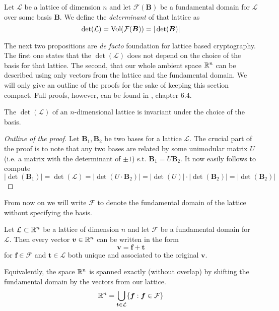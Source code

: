 \begin{definition}
    Let $\mathcal{L}$ be a lattice of dimension $n$ and let $\mathcal{F}(\bm{B})$ be a fundamental domain for $\mathcal{L}$ over some basis $\bm{B}$. We define the \textit{determinant} of that lattice as
    $$ \det (\mathcal{L}) = \text{Vol}(\mathcal{F(\boldsymbol{B})}) = |\det (\boldsymbol{B}) |$$
\end{definition}

The next two propositions are \textit{de facto} foundation for lattice based cryptography. The first one states that the $\det (\mathcal{L})$ does not depend on the choice of the basis for that lattice. The second, that our whole ambient space $\mathbb{R}^n$ can be described using only vectors from the lattice and the fundamental domain. We will only give an outline of the proofs for the sake of keeping this section compact. Full proofs, however, can be found in \cite{book}, chapter 6.4.

\begin{proposition}
    The $\det (\mathcal{L})$ of an $n$-dimensional lattice is invariant under the choice of the basis.
\end{proposition}

\begin{proof}[Outline of the proof]
    Let $\bm{B}_1, \bm{B}_2$ be two bases for a lattice $\mathcal{L}$. The crucial part of the proof is to note that any two bases are related by some unimodular matrix $U$ (i.e. a matrix with the determinant of $\pm 1$) s.t. $\bm{B}_1 = U \bm{B}_2$. It now easily follows to compute $| \det (\bm{B}_1) | = \det (\mathcal{L}) = | \det (U \cdot \bm{B}_2) | = | \det(U) | \cdot | \det(\bm{B}_2) | = | \det(\bm{B}_2)|$ 
\end{proof}

From now on we will write $\mathcal{F}$ to denote the fundamental domain of the lattice without specifying the basis.

\begin{proposition}
    Let $\mathcal{L} \subset \mathbb{R}^n$ be a lattice of dimension $n$ and let $\mathcal{F}$ be a fundamental domain for $\mathcal{L}$. Then every vector $\boldsymbol{v} \in \mathbb{R}^n$ can be written in the form 
    $$\bm{v} = \bm{f} + \bm{t}$$
    for $\bm{f} \in \mathcal{F}$ and $\bm{t} \in \mathcal{L}$ both unique and associated to the original $\bm{v}$.
\end{proposition}

Equivalently, the space $\mathbb{R}^n$ is spanned exactly (without overlap) by shifting the fundamental domain by the vectors from our lattice.
$$ \mathbb{R}^n = \bigcup_{\boldsymbol{t} \in \mathcal{L}} \{\boldsymbol{f} : \boldsymbol{f} \in \mathcal{F} \}$$

